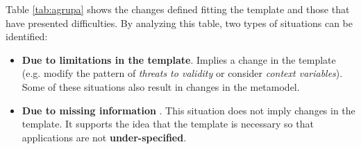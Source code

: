 %

 
 Table \ref{tab:agrupa} shows the changes defined fitting the template and those that have presented difficulties.
By analyzing this table, two types of situations can be identified:
\begin{itemize}
\item \textbf{Due to limitations in the template}. Implies a change in the template (e.g. modify the pattern of \emph{threats to validity} or consider \emph{context variables}). Some of these situations also result in changes in the metamodel.
\item  \textbf{Due to missing information }. This situation does not imply changes in the template.  It supports the idea that the template is necessary so that applications are not \textbf{under-specified}.
\end{itemize}

